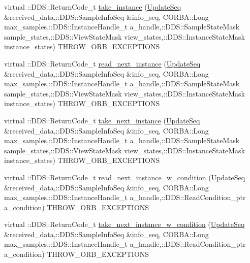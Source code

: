 \begin{DoxyCompactItemize}
\item 
virtual ::DDS::ReturnCode\_\-t \hyperlink{classKnowledge_1_1UpdateDataReaderView__impl_a504bd164c5da027116133c97e667fbcf}{take\_\-instance} (\hyperlink{namespaceKnowledge_ab62e46316b954f0d249e0e45de7059dc}{UpdateSeq} \&received\_\-data,::DDS::SampleInfoSeq \&info\_\-seq, CORBA::Long max\_\-samples,::DDS::InstanceHandle\_\-t a\_\-handle,::DDS::SampleStateMask sample\_\-states,::DDS::ViewStateMask view\_\-states,::DDS::InstanceStateMask instance\_\-states) THROW\_\-ORB\_\-EXCEPTIONS
\item 
virtual ::DDS::ReturnCode\_\-t \hyperlink{classKnowledge_1_1UpdateDataReaderView__impl_ad6e8960402af94ff61c4cbcc34050769}{read\_\-next\_\-instance} (\hyperlink{namespaceKnowledge_ab62e46316b954f0d249e0e45de7059dc}{UpdateSeq} \&received\_\-data,::DDS::SampleInfoSeq \&info\_\-seq, CORBA::Long max\_\-samples,::DDS::InstanceHandle\_\-t a\_\-handle,::DDS::SampleStateMask sample\_\-states,::DDS::ViewStateMask view\_\-states,::DDS::InstanceStateMask instance\_\-states) THROW\_\-ORB\_\-EXCEPTIONS
\item 
virtual ::DDS::ReturnCode\_\-t \hyperlink{classKnowledge_1_1UpdateDataReaderView__impl_ae8d6c5c090e0bc2b449e3a34f0b9d436}{take\_\-next\_\-instance} (\hyperlink{namespaceKnowledge_ab62e46316b954f0d249e0e45de7059dc}{UpdateSeq} \&received\_\-data,::DDS::SampleInfoSeq \&info\_\-seq, CORBA::Long max\_\-samples,::DDS::InstanceHandle\_\-t a\_\-handle,::DDS::SampleStateMask sample\_\-states,::DDS::ViewStateMask view\_\-states,::DDS::InstanceStateMask instance\_\-states) THROW\_\-ORB\_\-EXCEPTIONS
\item 
virtual ::DDS::ReturnCode\_\-t \hyperlink{classKnowledge_1_1UpdateDataReaderView__impl_ad93d3847428bd485761b142e88241cfb}{read\_\-next\_\-instance\_\-w\_\-condition} (\hyperlink{namespaceKnowledge_ab62e46316b954f0d249e0e45de7059dc}{UpdateSeq} \&received\_\-data,::DDS::SampleInfoSeq \&info\_\-seq, CORBA::Long max\_\-samples,::DDS::InstanceHandle\_\-t a\_\-handle,::DDS::ReadCondition\_\-ptr a\_\-condition) THROW\_\-ORB\_\-EXCEPTIONS
\item 
virtual ::DDS::ReturnCode\_\-t \hyperlink{classKnowledge_1_1UpdateDataReaderView__impl_ae951bfb12b156c6adb3f5f161f373d7e}{take\_\-next\_\-instance\_\-w\_\-condition} (\hyperlink{namespaceKnowledge_ab62e46316b954f0d249e0e45de7059dc}{UpdateSeq} \&received\_\-data,::DDS::SampleInfoSeq \&info\_\-seq, CORBA::Long max\_\-samples,::DDS::InstanceHandle\_\-t a\_\-handle,::DDS::ReadCondition\_\-ptr a\_\-condition) THROW\_\-ORB\_\-EXCEPTIONS
\item 

\end{DoxyCompactItemize}
